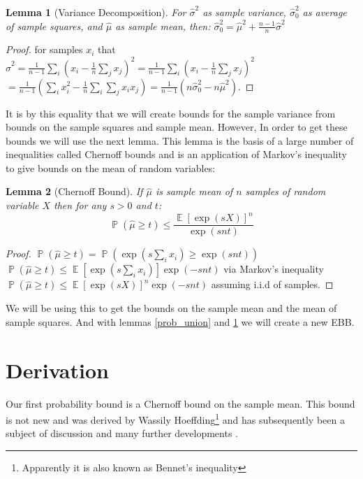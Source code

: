 \documentclass[aap,preprint]{imsart}
\newtheorem{lemma}{Lemma}
\DeclareMathOperator{\E}{\mathbb{E}}
\DeclareMathOperator{\p}{\mathbb{P}}
\begin{document}
\begin{lemma}[Variance Decomposition]\label{variance1}
For $\hat{\sigma}^2$ as sample variance, $\hat{\sigma}_0^2$ as average of sample squares, and $\hat{\mu}$ as sample mean, then:
$ \hat{\sigma}_0^2 = \hat{\mu}^2+\frac{n-1}{n}\hat{\sigma}^2 $
\end{lemma}
\begin{proof}
for samples $x_i$ that\\
$\hat{\sigma}^2=\frac{1}{n-1}\sum_i(x_i-\frac{1}{n}\sum_jx_j)^2 = \frac{1}{n-1}\sum_i(x_i-\frac{1}{n}\sum_jx_j)^2$\\
$=\frac{1}{n-1}(\sum_ix_i^2-\frac{1}{n}\sum_i\sum_jx_ix_j) = \frac{1}{n-1}(n\hat{\sigma}_0^2-n\hat{\mu}^2)$.
\end{proof}

It is by this equality that we will create bounds for the sample variance from bounds on the sample squares and sample mean.
However, In order to get these bounds we will use the next lemma. This lemma is the basis of a large number of inequalities called Chernoff bounds and is an application of Markov's inequality to give bounds on the mean of random variables\cite{hoeffding2}:

\begin{lemma}[Chernoff Bound]\label{chernoff1}
If $\hat{\mu}$ is sample mean of $n$ samples of random variable $X$ then for any $s>0$ and $t$:
$$ \textstyle\p(\hat{\mu}\ge t)\le\frac{\E\left[\exp(sX)\right]^n}{\exp(snt)} $$
\end{lemma}
\begin{proof}
$\p(\hat{\mu}\ge t) = \p(\exp(s\sum_ix_i)\ge \exp(snt))$\\
$\p(\hat{\mu}\ge t) \le \E[\exp(s\sum_ix_i)]\exp(-snt)$ via Markov's inequality \\ 
$\p(\hat{\mu}\ge t) \le \E\left[\exp(sX)\right]^n\exp(-snt)$ assuming i.i.d of samples.
\end{proof}

We will be using this to get the bounds on the sample mean and the mean of sample squares.
And with lemmas \ref{prob_union} and \ref{variance1} we will create a new EBB.

\section{Derivation}\label{derivation}

Our first probability bound is a Chernoff bound on the sample mean. This bound is not new and was derived by Wassily Hoeffding\footnote{Apparently it is also known as Bennet's inequality\cite{MR1782937}} \cite{hoeffding1} and has subsequently been a subject of discussion and many further developments \cite{hoeffding2,Bentkus08boundsfor,Pinelis2014,zbMATH00812598,MR1782937}.
\end{document}
